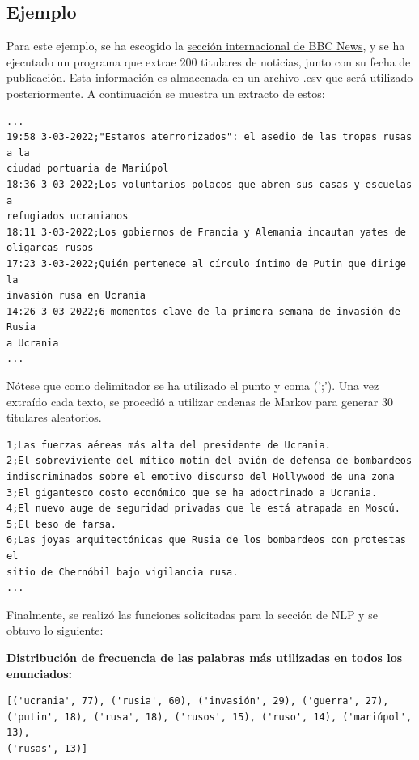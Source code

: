 \subsection*{Ejemplo}

Para este ejemplo, se ha escogido la \href{https://www.bbc.com/mundo/topics/c2lej05epw5t/page/1}{sección internacional de BBC News}, y se ha ejecutado un programa que extrae 200 titulares de noticias, junto con su fecha de publicación. Esta información es almacenada en un archivo .csv que será utilizado posteriormente. A continuación se muestra un extracto de estos:

\begin{verbatim}
...
19:58 3-03-2022;"Estamos aterrorizados": el asedio de las tropas rusas a la
ciudad portuaria de Mariúpol
18:36 3-03-2022;Los voluntarios polacos que abren sus casas y escuelas a 
refugiados ucranianos
18:11 3-03-2022;Los gobiernos de Francia y Alemania incautan yates de 
oligarcas rusos
17:23 3-03-2022;Quién pertenece al círculo íntimo de Putin que dirige la 
invasión rusa en Ucrania
14:26 3-03-2022;6 momentos clave de la primera semana de invasión de Rusia 
a Ucrania
...
\end{verbatim}

Nótese que como delimitador se ha utilizado el punto y coma (';'). Una vez extraído cada texto, se procedió a utilizar cadenas de Markov para generar 30 titulares aleatorios. 

\begin{verbatim}
1;Las fuerzas aéreas más alta del presidente de Ucrania.
2;El sobreviviente del mítico motín del avión de defensa de bombardeos
indiscriminados sobre el emotivo discurso del Hollywood de una zona
3;El gigantesco costo económico que se ha adoctrinado a Ucrania.
4;El nuevo auge de seguridad privadas que le está atrapada en Moscú.
5;El beso de farsa.
6;Las joyas arquitectónicas que Rusia de los bombardeos con protestas el 
sitio de Chernóbil bajo vigilancia rusa.
...
\end{verbatim}

Finalmente, se realizó las funciones solicitadas para la sección de NLP y se obtuvo lo siguiente:

\textbf{Distribución de frecuencia de las palabras más utilizadas en todos los enunciados:}

\begin{verbatim}
[('ucrania', 77), ('rusia', 60), ('invasión', 29), ('guerra', 27),
('putin', 18), ('rusa', 18), ('rusos', 15), ('ruso', 14), ('mariúpol', 13), 
('rusas', 13)]
\end{verbatim}

